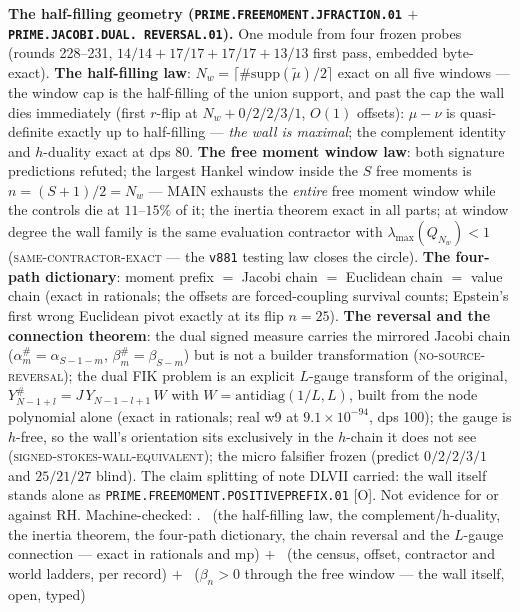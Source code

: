 \documentclass[11pt,a4paper]{article}
\theoremstyle{definition}
\begin{document}
\par\smallskip\noindent\textbf{The half-filling geometry
(\texttt{PRIME.\allowbreak FREEMOMENT.\allowbreak JFRACTION.01}
$+$ \texttt{PRIME.\allowbreak JACOBI.\allowbreak DUAL.\allowbreak
REVERSAL.01}).}
One module from four frozen probes (rounds 228--231, $14/14 +
17/17 + 17/17 + 13/13$ first pass, embedded byte-exact).
\textbf{The half-filling law}: $N_w = \lceil
\#\mathrm{supp}(\tilde\mu)/2 \rceil$ exact on all five windows
--- the window cap is the half-filling of the union support, and
past the cap the wall dies immediately (first $r$-flip at $N_w +
0/2/2/3/1$, $O(1)$ offsets): $\mu - \nu$ is quasi-definite
exactly up to half-filling --- \emph{the wall is maximal}; the
complement identity and $h$-duality exact at dps 80.  \textbf{The
free moment window law}: both signature predictions refuted; the
largest Hankel window inside the $S$ free moments is $n = (S+1)/2
= N_w$ --- MAIN exhausts the \emph{entire} free moment window
while the controls die at $11$--$15\%$ of it; the inertia theorem
exact in all parts; at window degree the wall family is the same
evaluation contractor with $\lambda_{\max}(Q_{N_w}) < 1$
(\textsc{same-contractor-exact} --- the \texttt{v881} testing law
closes the circle).  \textbf{The four-path dictionary}: moment
prefix $=$ Jacobi chain $=$ Euclidean chain $=$ value chain
(exact in rationals; the offsets are forced-coupling survival
counts; Epstein's first wrong Euclidean pivot exactly at its flip
$n = 25$).  \textbf{The reversal and the connection theorem}: the
dual signed measure carries the mirrored Jacobi chain
($\alpha^{\#}_m = \alpha_{S-1-m}$, $\beta^{\#}_m = \beta_{S-m}$)
but is not a builder transformation
(\textsc{no-source-reversal}); the dual FIK problem is an
explicit $L$-gauge transform of the original, $Y^{\#}_{N-1+l} =
J\,Y_{N-1-l+1}\,W$ with $W = \mathrm{antidiag}(1/L, L)$, built
from the node polynomial alone (exact in rationals; real w9 at
$9.1\times10^{-94}$, dps 100); the gauge is $h$-free, so the
wall's orientation sits exclusively in the $h$-chain it does not
see (\textsc{signed-stokes-wall-equivalent}); the micro falsifier
frozen (predict $0/2/2/3/1$ and $25/21/27$ blind).  The claim
splitting of note DLVII carried: the wall itself stands alone as
\texttt{PRIME.FREEMOMENT.POSITIVEPREFIX.01} [O].  Not evidence
for or against RH.
Machine-checked: .
\mE\ (the half-filling law, the complement/h-duality, the inertia
theorem, the four-path dictionary, the chain reversal and the
$L$-gauge connection --- exact in rationals and mp) $+$ \mC\ (the
census, offset, contractor and world ladders, per record) $+$
\mO\ ($\beta_n > 0$ through the free window --- the wall itself,
open, typed)
\par\smallskip
\end{document}
